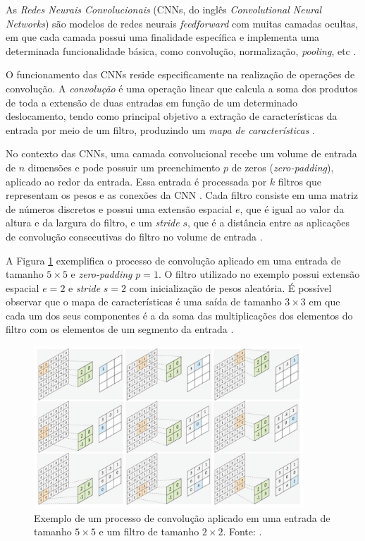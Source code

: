 As \textit{Redes Neurais Convolucionais} (CNNs, do inglês \textit{Convolutional Neural Networks}) são modelos de redes neurais \emph{feedforward} com muitas camadas ocultas, em que cada camada possui uma finalidade específica e implementa uma determinada funcionalidade básica, como convolução, normalização, \textit{pooling}, etc \cite{ref:goodfellow,ref:khan}.

O funcionamento das CNNs reside especificamente na realização de operações de convolução. A \textit{convolução} é uma operação linear que calcula a soma dos produtos de toda a extensão de duas entradas em função de um determinado deslocamento, tendo como principal objetivo a extração de características da entrada por meio de um filtro, produzindo um  \textit{mapa de características} \cite{ref:goodfellow,ref:sewak}.

No contexto das CNNs, uma camada convolucional recebe um volume de entrada de $n$ dimensões e pode possuir um preenchimento  $p$ de zeros (\textit{zero-padding}), aplicado ao redor da entrada. Essa entrada é processada por $k$ filtros que representam os pesos e as conexões da CNN \cite{ref:khan}. Cada filtro consiste em uma matriz de números discretos e possui uma extensão espacial $e$, que é igual ao valor da altura e da largura do filtro, e um \textit{stride} $s$, que é a distância entre as aplicações de convolução consecutivas do filtro no volume de entrada \cite{ref:buduma}.

A Figura \ref{img:convolucao} exemplifica o processo de convolução aplicado em uma entrada de tamanho $5\times 5$ e \textit{zero-padding} $p = 1$. O filtro utilizado no exemplo possui extensão espacial $e = 2$ e \textit{stride} $s = 2$ com inicialização de pesos aleatória. É possível observar que o mapa de características é uma saída de tamanho $3\times 3$ em que cada um dos seus componentes é a da soma das multiplicações dos elementos do filtro com os elementos de um segmento da entrada \cite{ref:khan}.

\begin{figure}[!ht]
	\centering
  \caption{Exemplo de um processo de convolução aplicado em uma entrada de tamanho $5\times 5$ e um filtro de tamanho $2\times 2$. Fonte: \cite{ref:khan}.}
  \label{img:convolucao}
	\includegraphics[width=0.9\textwidth]{./img/convolucao}
\end{figure}

